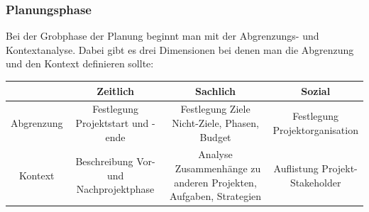 \documentclass{article}
\begin{document}
	\subsubsection{Planungsphase}
	Bei der Grobphase der Planung beginnt man mit der Abgrenzungs- und Kontextanalyse. Dabei gibt es drei Dimensionen bei denen man die Abgrenzung und den Kontext definieren sollte: \\
	\begin{tabular}{| c | c | c | c |}
		\toprule
		& Zeitlich & Sachlich & Sozial \\ \midrule
		Abgrenzung & \makecell{Festlegung \\ Projektstart und -ende} & \makecell{Festlegung Ziele \\ Nicht-Ziele, Phasen, Budget} & \makecell{Festlegung \\ Projektorganisation} \\ \hline
	Kontext & \makecell{Beschreibung Vor- \\ und \\ Nachprojektphase} & \makecell{Analyse \ Zusammenhänge zu \\ anderen Projekten, \\ Aufgaben, Strategien} & \makecell{Auflistung Projekt- \\ Stakeholder} \\
		\bottomrule
	\end{tabular}
\end{document}
